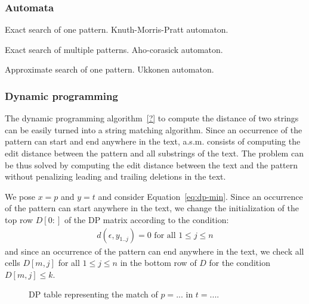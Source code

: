 \subsubsection{Automata}

Exact search of one pattern. Knuth-Morris-Pratt automaton.

Exact search of multiple patterns. Aho-corasick automaton.

Approximate search of one pattern. Ukkonen automaton.


\subsubsection{Dynamic programming}

The dynamic programming algorithm~\ref{?} to compute the distance of two strings can be easily turned into a string matching algorithm.
Since an occurrence of the pattern can start and end anywhere in the text, a.s.m. consists of computing the edit distance between the pattern and all substrings of the text.
The problem can be thus solved by computing the edit distance between the text and the pattern without penalizing leading and trailing deletions in the text.

We pose $x=p$ and $y=t$ and consider Equation~\ref{eq:dp-min}.
Since an occurrence of the pattern can start anywhere in the text, we change the initialization of the top row $D[0:]$ of the DP matrix according to the condition:
\begin{eqnarray}
d(\epsilon, y_{1..j}) = 0 \text{ for all } 1 \leq j \leq n
\end{eqnarray}
and since an occurrence of the pattern can end anywhere in the text, we check all cells $D[m,j]$ for all $1 \leq j \leq n$ in the bottom row of $D$ for the condition $D[m,j] \leq k$.

\begin{figure}[h]
\begin{center}
\caption[Example of approximate string matching via DP.]{DP table representing the match of $p=...$ in $t=...$.}
\label{fig:asm-dp}

\end{center}
\end{figure}




